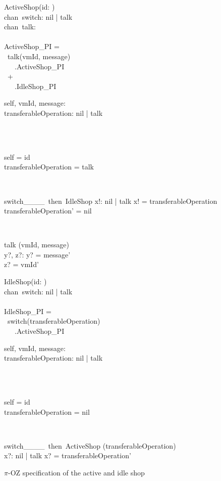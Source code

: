 \begin{figure}[H]
\centering
\begin{sidebyside}
\begin{class}{ActiveShop(id: \integer)}
\ 
\\chan\ switch: nil | talk
\ 
\\chan\ talk:\integer \times \integer
\ \\ \
\\ActiveShop\_PI = 
\\ \ talk(vmId, message)
\ \\ \ \ \ .ActiveShop\_PI
\\ \ + 
\ \\ \ \ \ .IdleShop\_PI
\\\begin{state}
self, vmId, message: \integer
\\transferableOperation: nil | talk
\end{state} 
\\
\begin{init}
\\self = id
\\transferableOperation = talk
\end{init} 
\\
\begin{op}{switch\_\_\_\_\ then\ IdleShop}
x!: nil | talk
\ST
x! = transferableOperation
\\transferableOperation' = nil
\end{op}
\\
\begin{op}{talk}
\Delta (vmId, message)
\\y?, z?: \integer
\ST
y? = message'
\\z? = vmId'
\end{op}
\end{class}
\nextside
\begin{class}{IdleShop(id: \integer)}
\ 
\\chan\ switch: nil | talk
\ \\ \
\\IdleShop\_PI = 
\\ \  switch(transferableOperation)
\ \\ \ \ \ .ActiveShop\_PI
\\
\begin{state}
self, vmId, message: \integer
\\transferableOperation: nil | talk
\end{state} 
\\
\begin{init}
\\self = id
\\transferableOperation = nil
\end{init} 
\\
\begin{op}{switch\_\_\_\_\ then\ ActiveShop}
\Delta (transferableOperation)
\\x?: nil | talk
\ST
x? = transferableOperation'
\end{op}
\end{class}
\end{sidebyside}
\caption{$\pi$-OZ specification of the active and idle shop}
\label{comp_oz_pi_statefull_shop}
\end{figure}